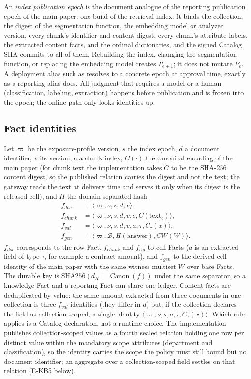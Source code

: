 \documentclass[journal,onecolumn]{IEEEtran}
\newcommand{\code}[1]{\texttt{\detokenize{#1}}}
\begin{document}
An \emph{index publication epoch} is the document analogue of the reporting
publication epoch of the main paper: one build of the retrieval index. It
binds the collection, the digest of the segmentation function, the embedding
model or analyzer version, every chunk's identifier and content digest, every
chunk's attribute labels, the extracted content facts, and the ordinal
dictionaries, and the signed Catalog SHA commits to all of them. Rebuilding
the index, changing the segmentation function, or replacing the embedding
model creates $P_{e+1}$; it does not mutate $P_e$. A deployment alias such as
\code{kb-latest} resolves to a concrete epoch at approval time, exactly as a
reporting alias does. All judgment that requires a model or a human
(classification, labeling, extraction) happens before publication and is
frozen into the epoch; the online path only looks identities up.

\subsection{Fact identities}

Let $\varpi$ be the exposure-profile version, $s$ the index epoch, $d$ a
document identifier, $v$ its version, $c$ a chunk index, $C(\cdot)$ the
canonical encoding of the main paper (for chunk text the implementation
takes $C$ to be the SHA-256 content digest, so the published relation carries
the digest and not the text; the gateway reads the text at delivery time and
serves it only when its digest is the released cell), and $H$ the
domain-separated hash.
\begin{align*}
 f_{doc}   &= \langle\varpi,\nu,s,d,v\rangle,\\
 f_{chunk} &= \langle\varpi,\nu,s,d,v,c,C(\mathrm{text}_c)\rangle,\\
 f_{val}   &= \langle\varpi,\nu,s,d,v,a,\tau,C_\tau(x)\rangle,\\
 f_{gen}   &= \langle\varpi,\mathcal B,H(\mathrm{answer}),CW(W)\rangle .
\end{align*}
$f_{doc}$ corresponds to the row Fact, $f_{chunk}$ and $f_{val}$ to cell
Facts ($a$ is an extracted field of type $\tau$, for example a contract
amount), and $f_{gen}$ to the derived-cell identity of the main paper with
the same witness multiset $W$ over base Facts. The durable key is
$\mathrm{SHA256}(d_R\,\|\,\operatorname{Canon}(f))$ under the same
separator, so a knowledge Fact and a reporting Fact can share one ledger.
Content facts are deduplicated by value: the same amount extracted from
three documents in one collection is three $f_{val}$ identities (they differ
in $d$) but, if the collection declares the field as collection-scoped, a
single identity $\langle\varpi,\nu,s,a,\tau,C_\tau(x)\rangle$. Which rule
applies is a Catalog declaration, not a runtime choice. The implementation
publishes collection-scoped values as a fourth sealed relation holding one
row per distinct value within the mandatory scope attributes (department and
classification), so the identity carries the scope the policy must still
bound but no document identifier; an aggregate over a collection-scoped
field settles on that relation (E-KB5 below).
\end{document}
